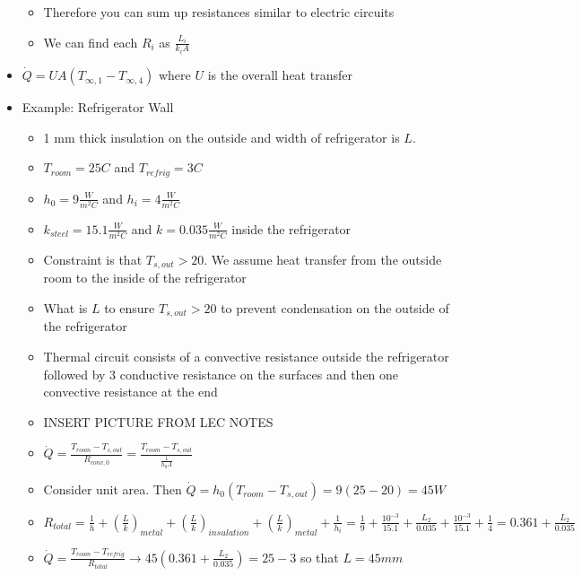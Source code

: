 \documentclass[12pt]{article}
\begin{document}
\begin{itemize}
\begin{itemize}
        \item Therefore you can sum up resistances similar to electric circuits
        \item We can find each $R_i$ as $\frac{L_i}{k_i A}$
    \end{itemize}
    \item $\dot{Q} = UA(T_{\infty, 1} - T_{\infty, 4})$ where $U$ is the overall heat transfer
    \item Example: Refrigerator Wall \begin{itemize}
        \item 1 mm thick insulation on the outside and width of refrigerator is $L$. 
        \item $T_{room} = 25C$ and $T_{refrig} = 3C$
        \item $h_0 = 9 \frac{W}{m^2C}$ and $h_i = 4 \frac{W}{m^2C}$
        \item $k_{steel} = 15.1  \frac{W}{m^2C}$ and $k = 0.035 \frac{W}{m^2C}$ inside the refrigerator
        \item Constraint is that $T_{s, out} > 20$. We assume heat transfer from the outside room to the inside of the refrigerator
        \item What is $L$ to ensure $T_{s, out} > 20$ to prevent condensation on the outside of the refrigerator
        \item Thermal circuit consists of a convective resistance outside the refrigerator followed by 3 conductive resistance on the surfaces and then one convective resistance at the end
        \item INSERT PICTURE FROM LEC NOTES
        \item $\dot{Q} = \frac{T_{room} - T_{s,out}}{R_{conv, 0}} = \frac{T_{room} - T_{s, out}}{\frac{1}{h_0A}}$
        \item Consider unit area. Then $\dot{Q} = h_0 (T_{room} - T_{s, out}) = 9(25-20) = 45 W$
        \item $R_{total} = \frac{1}{h} + (\frac{L}{k})_{metal} + (\frac{L}{k})_{insulation} + (\frac{L}{k})_{metal} + \frac{1}{h_i} = \frac{1}{9} + \frac{10^{-3}}{15.1} + \frac{L_2}{0.035} + \frac{10^{-3}}{15.1} + \frac{1}{4} = 0.361 + \frac{L_2}{0.035}$
        \item $\dot{Q} = \frac{T_{room} - T_{refrig}}{R_{total}} \rightarrow 45 (0.361 + \frac{L_2}{0.035}) = 25 - 3$ so that $L = 45 mm$
    \end{itemize}
\end{itemize}
\end{document}
